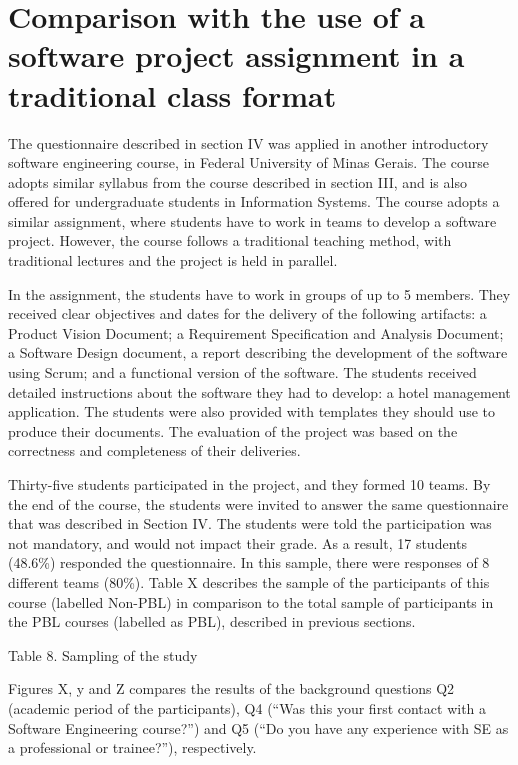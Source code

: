 \section{Comparison with the use of a software project assignment in a traditional class format}

The questionnaire described in section IV was applied in another introductory software engineering course, in Federal University of Minas Gerais. The course adopts similar syllabus from the course described in section III, and is also offered for undergraduate students in Information Systems. The course adopts a similar assignment, where students have to work in teams to develop a software project. However, the course follows a traditional teaching method, with traditional lectures and the project is held in parallel. 

In the assignment, the students have to work in groups of up to 5 members. They received clear objectives and dates for the delivery of the following artifacts: a Product Vision Document; a Requirement Specification and Analysis Document; a Software Design document, a report describing the development of the software using Scrum; and a functional version of the software. The students received detailed instructions about the software they had to develop: a hotel management application. The students were also provided with templates they should use to produce their documents. The evaluation of the project was based on the correctness and completeness of their deliveries. 

Thirty-five students participated in the project, and they formed 10 teams. By the end of the course, the students were invited to answer the same questionnaire that was described in Section IV. The students were told the participation was not mandatory, and would not impact their grade. As a result, 17 students (48.6\%) responded the questionnaire. In this sample, there were responses of 8 different teams (80\%). Table X describes the sample of the participants of this course (labelled Non-PBL) in comparison to the total sample of participants in the PBL courses (labelled as PBL), described in previous sections.

Table 8. Sampling of the study

Figures X, y and Z compares the results of the background questions Q2 (academic period of the participants), Q4 (“Was this your first contact with a Software Engineering course?”) and Q5 (“Do you have any experience with SE as a professional or trainee?”), respectively.

